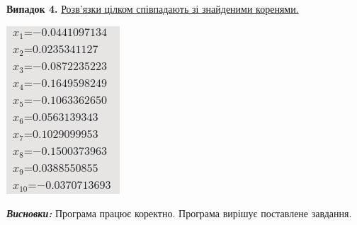 \documentclass[a4paper,12pt]{extarticle}
\begin{document}
\textbf{Випадок 4.}
\href{https://matrixcalc.org/slu.html#solve-using-Gaussian-elimination%28%7B%7B5442442106083,397906413301,483446130529,859307836741,533846558071,753171826712,111498164944,226787787862,915360751561,646735191345,-439933824352%7D,%7B323513666167,499402101151,5850872702896,759092286229,665525016374,200213695876,957208361476,977150163613,606805434450,659885268658,-746553321368%7D,%7B978051814250,95173848792,222138401120,4967742037028,224028622731,960093244910,175048520788,602490698918,90301644057,907289128750,-952018707990%7D,%7B561327290721,927189557813,179424052126,159479457885,5237287939991,665460496209,94784803688,512744266539,732445917092,876452306285,-635544592514%7D,%7B592714574187,808455981,855745888315,592752953991,615564410574,6054263013415,462551322765,252638222649,883837690576,866704741492,88843142613%7D,%7B775162920355,869065043516,821982750669,913794621825,377653619274,268318892456,7046072255820,821083750575,717520229518,842066667042,337357386015%7D,%7B28544501401,79854708164,613387024961,567857810296,458711232058,345832942053,444310115650,4033298916649,385900789871,598207473754,-742461585439%7D,%7B327392338775,324362377636,405820226296,720089737325,925245883874,289657917805,586794478818,75562573038,4456672783475,151547423563,-26469825766%7D,%7B410567755810,200502001680,922746033407,705211281776,589484004303,640266263857,863144615665,720418960787,80886214971,5787289902567,-467499190010%7D,%7B632644191384,5702067064121,849414308555,878333752043,811665924265,536486481316,719873721711,108479368500,484898155555,462335307151,-109281617216%7D%7D%29}{Розв'язки цілком співпадають зі знайденими коренями.}\\
\begin{center}
	\includegraphics{examples/visual.png}\\
\end{center}
\emph{\textbf{Висновки:}} Програма працює коректно. Програма вирішує поставлене завдання.
\end{document}
